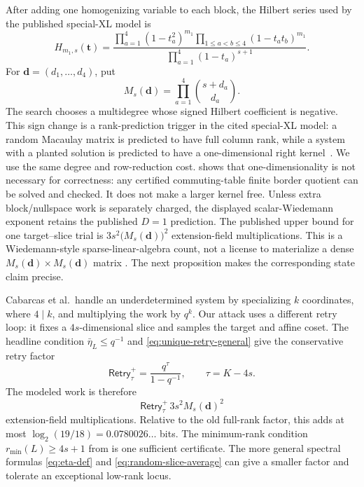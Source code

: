 \documentclass[11pt]{article}
\begin{document}
After adding one homogenizing variable to each block, the Hilbert series used
by the published special-XL model is
\begin{equation}\label{eq:hilbert-series}
 H_{m_1,s}(\mathbf t)=
 \frac{\prod_{a=1}^{4}(1-t_a^2)^{m_1}
       \prod_{1\le a<b\le4}(1-t_at_b)^{m_1}}
      {\prod_{a=1}^{4}(1-t_a)^{s+1}}.
\end{equation}
For $\mathbf d=(d_1,\ldots,d_4)$, put
\begin{equation}\label{eq:macaulay-size}
 M_s(\mathbf d)=\prod_{a=1}^{4}\binom{s+d_a}{d_a}.
\end{equation}
The search chooses a multidegree whose signed Hilbert coefficient is
negative.  This sign change is a rank-prediction trigger in the cited
special-XL model: a random Macaulay matrix is predicted to have full column
rank, while a system with a planted solution is predicted to have a
one-dimensional right kernel~\cite{Cabarcas2025SNOVA}.  We use the same degree
and row-reduction cost.   shows that
one-dimensionality is not necessary for correctness: any certified
commuting-table finite border quotient can be solved and checked.  It does
not make a larger kernel free.  Unless extra block/nullspace work is separately
charged, the displayed scalar-Wiedemann exponent retains the published
$D=1$ prediction.  The published upper bound for one target--slice trial is
$3s^2\bigl(M_s(\mathbf d)\bigr)^2$ extension-field multiplications.  This is a
Wiedemann-style sparse-linear-algebra count, not a license to materialize a
dense $M_s(\mathbf d)\times M_s(\mathbf d)$ matrix
\cite{Beullens2024SNOVA,Cabarcas2025SNOVA,ChengEtAl2012XL}.  The next
proposition makes the corresponding state claim precise.

Cabarcas et al.\ handle an underdetermined system by specializing $k$
coordinates, where $4\mid k$, and multiplying the work by $q^k$.  Our attack
uses a different retry loop: it fixes a $4s$-dimensional slice and samples the
target and affine coset.  The headline condition $\bar\eta_L\le q^{-1}$ and
\eqref{eq:unique-retry-general} give the conservative retry factor
\[
 \mathsf{Retry}^{+}_{\tau}=\frac{q^\tau}{1-q^{-1}},
 \qquad \tau=K-4s.
\]
The modeled work is therefore
\begin{equation}\label{eq:special-xl-cost}
 \mathsf{Retry}^{+}_{\tau}\,3s^2M_s(\mathbf d)^2
\end{equation}
extension-field multiplications.  Relative to the old full-rank factor, this
adds at most $\log_2(19/18)=0.0780026\ldots$ bits.  The minimum-rank condition $r_{\min}(L)\ge4s+1$ from
 is one sufficient certificate.  The more general
spectral formulas \eqref{eq:eta-def} and \eqref{eq:random-slice-average} can
give a smaller factor and tolerate an exceptional low-rank locus.
\end{document}
